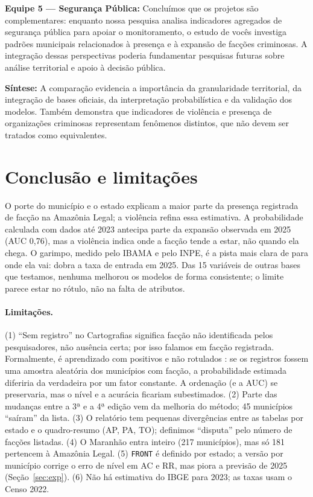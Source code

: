 \documentclass[10pt,a4paper,twocolumn]{article}
\begin{document}
\smallskip
\noindent\textbf{Equipe 5 --- Segurança Pública:} Concluímos que os projetos são
complementares: enquanto nossa pesquisa analisa indicadores agregados de segurança pública
para apoiar o monitoramento, o estudo de vocês investiga padrões municipais relacionados à
presença e à expansão de facções criminosas. A integração dessas perspectivas poderia
fundamentar pesquisas futuras sobre análise territorial e apoio à decisão pública.

\smallskip
\noindent\textbf{Síntese:} A comparação evidencia a importância da granularidade
territorial, da integração de bases oficiais, da interpretação probabilística e da validação
dos modelos. Também demonstra que indicadores de violência e presença de organizações
criminosas representam fenômenos distintos, que não devem ser tratados como equivalentes.

\section{Conclusão e limitações}\label{sec:concl}

O porte do município e o estado explicam a maior parte da presença registrada de facção na
Amazônia Legal; a violência refina essa estimativa. A probabilidade calculada com dados até
2023 antecipa parte da expansão observada em 2025 (AUC 0,76), mas a violência indica onde a
facção tende a estar, não quando ela chega. O garimpo, medido pelo IBAMA e pelo INPE, é a
pista mais clara de para onde ela vai: dobra a taxa de entrada em 2025. Das 15 variáveis de
outras bases que testamos, nenhuma melhorou os modelos de forma consistente; o limite parece
estar no rótulo, não na falta de atributos.

\paragraph{Limitações.} (1) ``Sem registro'' no Cartografias significa facção não
identificada pelos pesquisadores, não ausência certa; por isso falamos em facção registrada.
Formalmente, é aprendizado com positivos e não rotulados \cite{r18}: se os registros fossem
uma amostra aleatória dos municípios com facção, a probabilidade estimada diferiria da
verdadeira por um fator constante. A ordenação (e a AUC) se preservaria, mas o nível e a
acurácia ficariam subestimados. (2) Parte das mudanças entre a 3ª e a 4ª edição vem da
melhoria do método; 45 municípios ``saíram'' da lista. (3) O relatório tem pequenas
divergências entre as tabelas por estado e o quadro-resumo (AP, PA, TO); definimos
``disputa'' pelo número de facções listadas. (4) O Maranhão entra inteiro (217 municípios),
mas só 181 pertencem à Amazônia Legal. (5) \texttt{FRONT} é definido por estado; a versão
por município corrige o erro de nível em AC e RR, mas piora a previsão de 2025
(Seção~\ref{sec:exp}). (6) Não há estimativa do IBGE para 2023; as taxas usam o Censo 2022.
\end{document}
